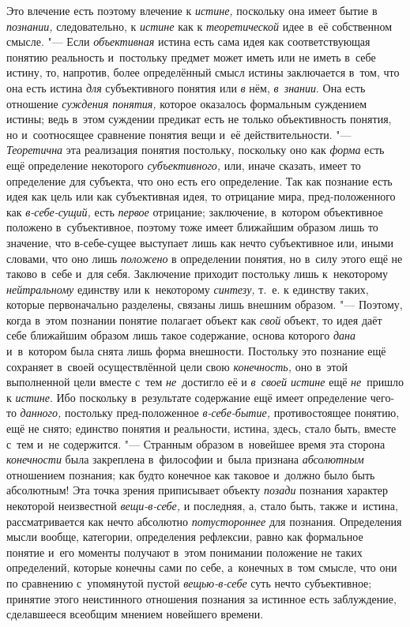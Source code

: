 Это влечение есть поэтому влечение к {\em истине,} поскольку
она имеет бытие в {\em познании,} следовательно, к {\em истине} как к
{\em теоретической} идее в~её собственном смысле. "--- Если
{\em объективная} истина
есть сама идея как соответствующая понятию реальность и~постольку предмет
может иметь или не иметь в~себе истину, то, напротив, более определённый
смысл истины заключается в~том, что она есть истина
{\em для} субъективного понятия или {\em в} нём, {\em в~знании}. Она есть
отношение {\em суждения понятия,}
которое оказалось формальным суждением истины; ведь в~этом
суждении предикат есть не только объективность понятия, но и~соотносящее
сравнение понятия вещи и~её действительности. "---
{\em Теоретична} эта реализация понятия постольку, поскольку оно как
{\em форма} есть ещё определение некоторого {\em субъективного,} или,
иначе сказать, имеет то определение для субъекта, что оно есть его
определение. Так как познание есть идея как цель или как субъективная идея,
то отрицание мира, пред-положенного как {\em в-себе-сущий,} есть
{\em первое} отрицание;
заключение, в~котором объективное положено в~субъективное, поэтому тоже
имеет ближайшим образом лишь то значение, что в-себе-сущее выступает лишь
как нечто субъективное или, иными словами, что оно лишь
{\em положено} в
определении понятия, но в~силу этого ещё не таково в~себе и~для себя.
Заключение приходит постольку лишь к~некоторому
{\em нейтральному} единству или к~некоторому {\em синтезу,} т.~е. к
единству таких, которые первоначально разделены, связаны лишь внешним
образом. "--- Поэтому, когда в~этом познании понятие полагает
объект как {\em свой}
объект, то идея даёт себе ближайшим образом лишь такое
содержание, основа которого {\em дана}
и~в~котором была снята лишь форма внешности. Постольку это
познание ещё сохраняет в~своей осуществлённой цели свою
{\em конечность,} оно в~этой выполненной цели вместе с~тем
{\em не}~достигло её и {\em в~своей истине} ещё
{\em не}~пришло к {\em истине}. Ибо
поскольку в~результате содержание ещё имеет определение чего-то
{\em данного,} постольку
пред-положенное {\em в-себе-бытие,}
противостоящее понятию, ещё не снято; единство понятия и
реальности, истина, здесь, стало быть, вместе с~тем и~не содержится. "---
Странным образом в~новейшее время эта сторона {\em конечности} была
закреплена в~философии и~была признана {\em абсолютным} отношением
познания;
как будто конечное как таковое и~должно было быть абсолютным!
Эта точка зрения приписывает объекту {\em позади} познания
характер некоторой неизвестной {\em вещи-в-себе,} и
последняя, а, стало быть, также и~истина, рассматривается
как нечто абсолютно {\em потустороннее}
для познания. Определения мысли вообще, категории,
определения рефлексии, равно как формальное понятие и~его моменты получают
в~этом понимании положение не таких определений, которые конечны сами по
себе, а~конечных в~том смысле, что они по сравнению с~упомянутой пустой
{\em вещью-в-себе} суть
нечто субъективное; принятие этого неистинного отношения познания за
истинное есть заблуждение, сделавшееся всеобщим мнением новейшего времени.

